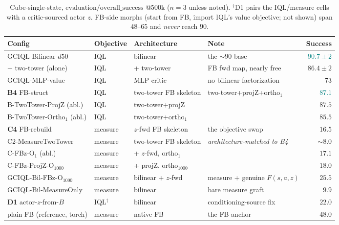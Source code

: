 \documentclass[11pt]{article}
\newcommand{\Bmap}{B}                                %
\newcommand{\good}[1]{\textcolor{teal}{#1}}
\newcommand{\bad}[1]{\textcolor{red!70!black}{#1}}
\begin{document}
\begin{table}[h]
\centering
\small
\begin{tabular}{@{}llll r@{}}
\toprule
\textbf{Config} & \textbf{Objective} & \textbf{Architecture} & \textbf{Note} & \textbf{Success} \\
\midrule
GCIQL-Bilinear-$d50$          & IQL       & bilinear                 & the ${\sim}90$ base            & \good{$90.7\pm2$} \\
\;+ two-tower (alone)         & IQL       & \;+ two-tower            & FB fwd map, nearly free        & $86.4\pm2$ \\
GCIQL-MLP-value               & IQL       & MLP critic               & no bilinear factorization      & $73$ \\
\midrule
\textbf{B4} FB-struct         & IQL       & two-tower FB skeleton    & two-tower+projZ+ortho$_1$      & \good{$\mathbf{87.1}$} \\
\;\;B-TwoTower-ProjZ (abl.)   & IQL       & two-tower+projZ          &                                & $87.5$ \\
\;\;B-TwoTower-Ortho$_1$ (abl.)& IQL      & two-tower+ortho$_1$      &                                & $85.5$ \\
\midrule
\textbf{C4} FB-rebuild        & measure   & $z$-fwd FB skeleton      & the objective swap             & \bad{$\mathbf{16.5}$} \\
\;\;C2-MeasureTwoTower        & measure   & two-tower FB skeleton    & \emph{architecture-matched to B4} & \bad{${\sim}8.0$} \\
\;\;C-FBz-O$_1$ (abl.)        & measure   & \;+ $z$-fwd, ortho$_1$   &                                & $17.1$ \\
\;\;C-FBz-ProjZ-O$_{1000}$    & measure   & \;+ projZ, ortho$_{1000}$&                                & $18.0$ \\
GCIQL-Bil-FBz-O$_{1000}$      & measure   & bilinear + $z$-fwd       & measure + genuine $F(s,a,z)$   & $25.5$ \\
GCIQL-Bil-MeasureOnly         & measure   & bilinear                 & bare measure graft             & \bad{$9.9$} \\
\midrule
\textbf{D1} actor-$z$-from-$\Bmap$ & IQL$^\dagger$ & bilinear            & conditioning-source fix        & $22.0$ \\
plain FB (reference, torch)   & measure   & native FB                & the FB anchor                  & $48.0$ \\
\bottomrule
\end{tabular}
\caption{Cube-single-state, $\mathrm{evaluation/overall\_success}$ @500k
($n{=}3$ unless noted). $^\dagger$D1 pairs the IQL/measure cells with a
critic-sourced actor $z$. FB-side morphs (start from FB, import IQL's value
objective; not shown) span $48$--$65$ and \emph{never} reach $90$.}
\label{tab:bridge}
\end{table}
\end{document}
